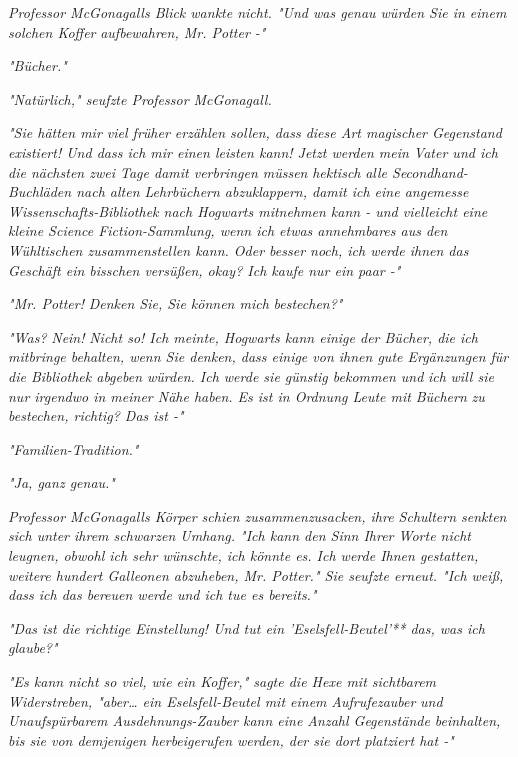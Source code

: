 {\emph{Professor McGonagalls Blick wankte nicht. "Und was genau würden Sie in einem solchen Koffer} \emph{\emph{aufbewahren}, Mr. Potter -"}

\emph{"Bücher."}

\emph{"Natürlich," seufzte Professor McGonagall.}

\emph{"Sie hätten mir viel früher erzählen sollen, dass diese Art magischer Gegenstand existiert! Und dass ich mir einen leisten kann! Jetzt werden mein Vater und ich die nächsten zwei Tage damit verbringen müssen} \emph{\emph{hektisch}} \emph{alle Secondhand-Buchläden nach alten Lehrbüchern abzuklappern, damit ich eine angemesse Wissenschafts-Bibliothek nach Hogwarts mitnehmen kann - und vielleicht eine kleine Science Fiction-Sammlung, wenn ich etwas annehmbares aus den Wühltischen zusammenstellen kann. Oder besser noch, ich werde ihnen das Geschäft ein bisschen versüßen, okay? Ich kaufe nur ein paar -"}

\emph{"\emph{Mr. Potter!}} \emph{Denken Sie, Sie können mich} \emph{\emph{bestechen?}"}

\emph{"Was?} \emph{\emph{Nein!}} \emph{Nicht so! Ich meinte, Hogwarts kann einige der Bücher, die ich mitbringe behalten, wenn Sie denken, dass einige von ihnen gute Ergänzungen für die Bibliothek abgeben würden. Ich werde sie günstig bekommen und} \emph{\emph{ich}} \emph{will sie nur irgendwo in meiner Nähe haben. Es ist in Ordnung Leute mit} \emph{\emph{Büchern}} \emph{zu bestechen, richtig? Das ist -"}

\emph{"Familien-Tradition."}

\emph{"Ja, ganz genau."}

\emph{Professor McGonagalls Körper schien zusammenzusacken, ihre Schultern senkten sich unter ihrem schwarzen Umhang. "Ich kann den Sinn Ihrer Worte nicht leugnen, obwohl ich sehr wünschte, ich könnte es. Ich werde Ihnen gestatten, weitere hundert Galleonen abzuheben, Mr. Potter." Sie seufzte erneut. "Ich} \emph{\emph{weiß}, dass ich das bereuen werde und ich tue es bereits."}

\emph{"Das ist die richtige Einstellung! Und tut ein 'Eselsfell-Beutel'** das, was ich glaube?"}

\emph{"Es kann nicht so viel, wie ein Koffer," sagte die Hexe mit sichtbarem} \emph{Widerstreben, "aber… ein Eselsfell-Beutel mit einem} \emph{Aufrufezauber} \emph{und Unaufspürbarem Ausdehnungs-Zauber kann eine Anzahl Gegenstände beinhalten, bis sie von demjenigen herbeigerufen werden, der sie dort platziert hat -"}

}
